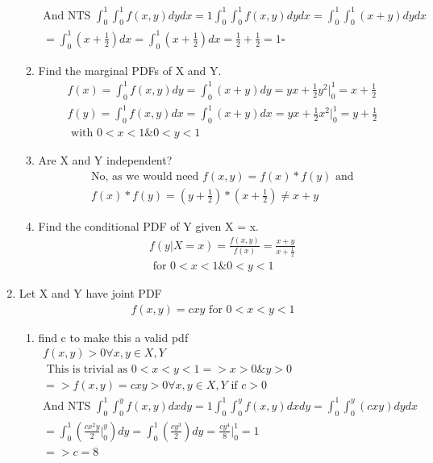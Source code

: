 \documentclass[11pt]{article}
\begin{document}
\begin{enumerate}
\begin{enumerate}
\begin{gather}
		\text{And NTS } \int_{0}^{1}\int_{0}^{1}f(x,y)dydx = 1
		\int_{0}^{1}\int_{0}^{1}f(x,y)dydx = 	\int_{0}^{1}\int_{0}^{1} (x+ y)dydx \\
		= \int_{0}^{1}(x+\frac{1}{2})dx = \int_{0}^{1}(x+\frac{1}{2})dx = \frac{1}{2} + \frac{1}{2} = 1 \square
	\end{gather}
	\item Find the marginal PDFs of X and Y.
	\begin{gather}
		f(x) = \int_{0}^{1}f(x,y)dy = \int_{0}^{1}(x+ y)dy  = yx + \frac{1}{2}y^2 \big|_0^1 = x+\frac{1}{2}\\
		f(y) = \int_{0}^{1}f(x,y)dx = \int_{0}^{1}(x+ y)dx  = yx + \frac{1}{2}x^2 \big|_0^1 = y+\frac{1}{2}\\
		\text{ with } 0<x<1 \& 0<y<1
	\end{gather}
	\item Are X and Y independent?
	\begin{gather}
		\text{No, as we would need }f(x,y) = f(x)*f(y) \text{ and}\\
		f(x)*f(y) = (y+\frac{1}{2}) *  (x+\frac{1}{2}) \ne x+y
	\end{gather}
	\item  Find the conditional PDF of Y given X = x.
	\begin{gather}
		f(y|X=x) = \frac{f(x,y)}{f(x)} = \frac{x+y}{x+\frac{1}{2}}\\
		\text{ for } 0<x<1 \& 0<y<1
	\end{gather}
\end{enumerate}
\item Let X and Y have joint PDF
\begin{gather}
	f(x,y) = cxy \text{ for } 0<x<y<1
\end{gather}
\begin{enumerate}
	\item find c to make this a valid pdf
	\begin{gather}
			f(x,y)>0 \forall x,y \in X,Y \\
			\text{ This is trivial as } 0<x<y<1 => x>0 \& y>0 \\
			=> f(x,y) = cxy >0 \forall x,y \in X,Y \text{ if }c>0\\
			\text{And NTS } \int_{0}^{1}\int_{0}^{y}f(x,y)dxdy = 1
			\int_{0}^{1}\int_{0}^{y}f(x,y)dxdy = 	\int_{0}^{1}\int_{0}^{y} (cxy)dydx \\
			= \int_{0}^{1}(\frac{cx^2y}{2}\big|_0^y)dy =\int_{0}^{1}(\frac{cy^3}{2})dy = \frac{cy^4}{8}\big|_0^1 = 1\\
			=> c = 8
	\end{gather}

\end{enumerate}
\end{enumerate}
\end{document}
